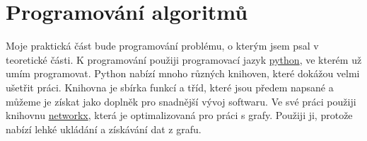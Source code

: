 \chapter{Programování algoritmů}
\label{chap:programovani}

Moje praktická část bude programování problému, o kterým jsem psal v teoretické části. K programování použiji programovací jazyk \href{https://www.python.org/}{python}, ve kterém už umím programovat. Python nabízí mnoho různých knihoven, které dokážou velmi ušetřit práci. Knihovna je sbírka funkcí a tříd, které jsou předem napsané a můžeme je získat jako doplněk pro snadnější vývoj softwaru. Ve své práci použiji knihovnu \href{https://networkx.org/}{networkx}, která je optimalizovaná pro práci s grafy. Použiji ji, protože nabízí lehké ukládání a získávání dat z grafu.


